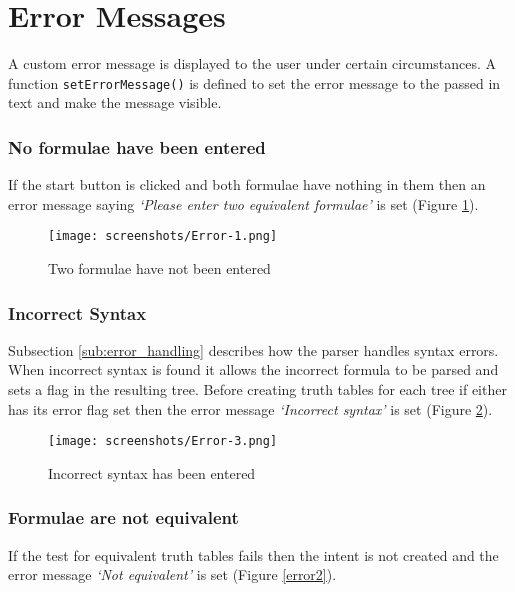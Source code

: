 \documentclass{report}
\begin{document}
\section{Error Messages}
\label{error_messages}

A custom error message is displayed to the user under certain circumstances. A function {\tt setErrorMessage()} is defined to set the error message to the passed in text and make the message visible.

\subsubsection{No formulae have been entered}

If the start button is clicked and both formulae have nothing in them then an error message saying \textit{`Please enter two equivalent formulae'} is set (Figure \ref{error1}).

\begin{figure}[ht!]
    \centering
    \texttt{[image: screenshots/Error-1.png]}
    \caption{Two formulae have not been entered}
    \label{error1}
\end{figure}

\subsubsection{Incorrect Syntax}

Subsection \ref{sub:error_handling} describes how the parser handles syntax errors. When incorrect syntax is found it allows the incorrect formula to be parsed and sets a flag in the resulting tree. Before creating truth tables for each tree if either has its error flag set then the error message \textit{`Incorrect syntax'} is set (Figure \ref{error3}).

\begin{figure}[ht!]
    \centering
    \texttt{[image: screenshots/Error-3.png]}
    \caption{Incorrect syntax has been entered}
    \label{error3}
\end{figure}

\subsubsection{Formulae are not equivalent}

If the test for equivalent truth tables fails then the intent is not created and the error message \textit{`Not equivalent'} is set (Figure \ref{error2}).
\end{document}

